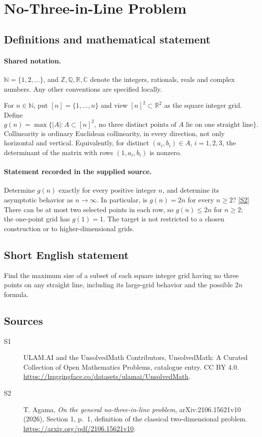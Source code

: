 \documentclass[11pt]{article}
\newcommand{\sref}[2]{\hyperlink{source:#1:#2}{[S#2]}}
\begin{document}
\section{No-Three-in-Line Problem}\label{statement}

\subsection{Definitions and mathematical statement}

\paragraph{Shared notation.}$\mathbb N=\{1,2,\ldots\}$, and $\mathbb Z,\mathbb Q,\mathbb R,\mathbb C$ denote the integers, rationals, reals and complex numbers. Any other conventions are specified locally.


For $n\in\mathbb N$, put $[n]=\{1,\ldots,n\}$ and view $[n]^2\subset\mathbb R^2$ as the square integer grid. Define
\[g(n)=\max\{|A|:A\subset[n]^2,\ \text{no three distinct points of }A\text{ lie on one straight line}\}.\]
Collinearity is ordinary Euclidean collinearity, in every direction, not only horizontal and vertical. Equivalently, for distinct $(a_i,b_i)\in A$, $i=1,2,3$, the determinant of the matrix with rows $(1,a_i,b_i)$ is nonzero.
\paragraph{Statement recorded in the supplied source.}
Determine $g(n)$ exactly for every positive integer $n$, and determine its asymptotic behavior as $n\to\infty$. In particular, is $g(n)=2n$ for every $n\ge2$? \sref{statement}{2}
There can be at most two selected points in each row, so $g(n)\le2n$ for $n\ge2$; the one-point grid has $g(1)=1$. The target is not restricted to a chosen construction or to higher-dimensional grids.
\subsection{Short English statement}
Find the maximum size of a subset of each square integer grid having no three points on any straight line, including its large-grid behavior and the possible $2n$ formula.
\subsection{Sources}
\begin{description}
\item[\hypertarget{source:statement:1}{S1}] ULAM.AI and the UnsolvedMath Contributors, UnsolvedMath: A Curated Collection of Open Mathematics Problems, catalogue entry. CC BY 4.0. \url{https://huggingface.co/datasets/ulamai/UnsolvedMath}.
\item[\hypertarget{source:statement:2}{S2}] T. Agama, \emph{On the general no-three-in-line problem}, arXiv:2106.15621v10 (2026), Section 1, p.\ 1, definition of the classical two-dimensional problem. \url{https://arxiv.org/pdf/2106.15621v10}.
\end{description}
\label{end:statement}
\end{document}
